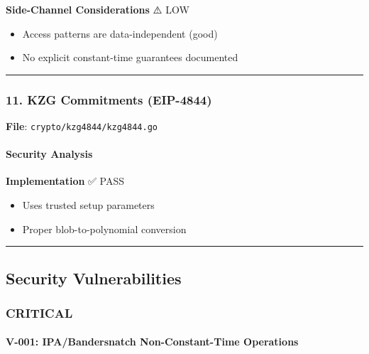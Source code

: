 \documentclass[
]{article}
\providecommand{\tightlist}{%
  \setlength{\itemsep}{0pt}\setlength{\parskip}{0pt}}
\begin{document}
\textbf{Side-Channel Considerations} ⚠️ LOW

\begin{itemize}
\tightlist
\item
  Access patterns are data-independent (good)
\item
  No explicit constant-time guarantees documented
\end{itemize}

\begin{center}\rule{0.5\linewidth}{0.5pt}\end{center}

\subsubsection{11. KZG Commitments
(EIP-4844)}\label{11-kzg-commitments-eip-4844}

\textbf{File}: \texttt{crypto/kzg4844/kzg4844.go}

\paragraph{Security Analysis}\label{security-analysis-8}

\textbf{Implementation} ✅ PASS

\begin{itemize}
\tightlist
\item
  Uses trusted setup parameters
\item
  Proper blob-to-polynomial conversion
\end{itemize}

\begin{center}\rule{0.5\linewidth}{0.5pt}\end{center}

\subsection{Security Vulnerabilities}\label{security-vulnerabilities}

\subsubsection{CRITICAL}\label{critical}

\paragraph{V-001: IPA/Bandersnatch Non-Constant-Time
Operations}\label{v-001-ipabandersnatch-non-constant-time-operations}
\end{document}
